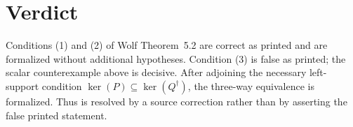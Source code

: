 \documentclass{article}
\begin{document}
\section{Verdict}
Conditions (1) and (2) of Wolf Theorem~5.2 are correct as printed and are
formalized without additional hypotheses. Condition (3) is false as printed;
the scalar counterexample above is decisive. After adjoining the necessary
left-support condition $\ker(P)\subseteq\ker(Q^\dagger)$, the three-way
equivalence is formalized. Thus  is resolved by a source
correction rather than by asserting the false printed statement.
\end{document}
